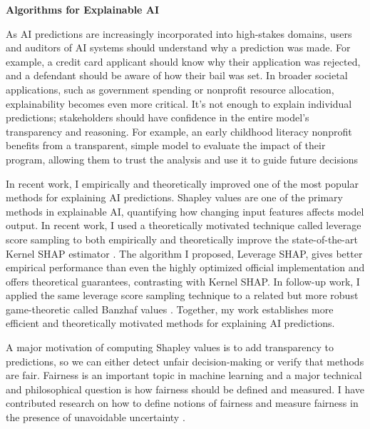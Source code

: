 \documentclass[11pt]{article}
\begin{document}
{\begin{center}
{\large \textbf{Algorithms for Explainable AI}}
\end{center}

As AI predictions are increasingly incorporated into high-stakes domains, users and auditors of AI systems should understand why a prediction was made. For example, a credit card applicant should know why their application was rejected, and a defendant should be aware of how their bail was set. In broader societal applications, such as government spending or nonprofit resource allocation, explainability becomes even more critical. It’s not enough to explain individual predictions; stakeholders should have confidence in the entire model’s transparency and reasoning. For example, an early childhood literacy nonprofit benefits from a transparent, simple model to evaluate the impact of their program, allowing them to trust the analysis and use it to guide future decisions

In recent work, I empirically and theoretically improved one of the most popular methods for explaining AI predictions. Shapley values are one of the primary methods in explainable AI, quantifying how changing input features affects model output.
In recent work, I used a theoretically motivated technique called leverage score sampling to both empirically and theoretically improve the state-of-the-art Kernel SHAP estimator \cite{musco2024leverage}. The algorithm I proposed, Leverage SHAP, gives better empirical performance than even the highly optimized official implementation and offers theoretical guarantees, contrasting with Kernel SHAP. In follow-up work, I applied the same leverage score sampling technique to a related but more robust game-theoretic called Banzhaf values \cite{liu2024kernel}. Together, my work establishes more efficient and theoretically motivated methods for explaining AI predictions.

A major motivation of computing Shapley values is to add transparency to predictions, so we can either detect unfair decision-making or verify that methods are fair. Fairness is an important topic in machine learning and a major technical and philosophical question is how fairness should be defined and measured. I have contributed research on how to define notions of fairness \cite{rosenblatt2023counterfactual} and measure fairness in the presence of unavoidable uncertainty \cite{witter2024fairlyuncertain}.

}
\end{document}
